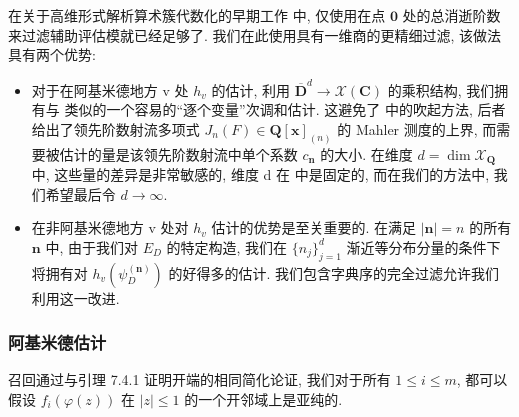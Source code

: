 \begin{remark}\label{rem:8.2.10}
在关于高维形式解析算术簇代数化的早期工作 \cite{Bos01}\cite{Bos04} 中, 
仅使用在点 \(\mathbf{0}\) 处的总消逝阶数来过滤辅助评估模就已经足够了. 
我们在此使用具有一维商的更精细过滤, 该做法具有两个优势:
\begin{itemize}
  \item[(1)] 对于在阿基米德地方 v 处 \(h_v\) 的估计, 
  利用 \(\overline{\mathbf{D}}^d \to \mathcal{X}(\mathbf{C})\) 的乘积结构, 
  我们拥有与 \cite[引理 2.4.1]{CDT21} 类似的一个容易的“逐个变量”次调和估计. 
  这避免了 \cite[第 4.3.2 节]{Bos01} 中的吹起方法, 
  后者给出了领先阶数射流多项式 \(J_n(F) \in \mathbf{Q}[\mathbf{x}]_{(n)}\) 的 Mahler 测度的上界, 
  而需要被估计的量是该领先阶数射流中单个系数 \(c_{\mathbf{n}}\) 的大小. 
  在维度 \(d = \dim \mathcal{X}_{\mathbf{Q}}\) 中, 这些量的差异是非常敏感的, 
  维度 d 在 \cite{Bos01} 中是固定的, 
  而在我们的方法中, 我们希望最后令 \(d \to \infty\).
  \item[(2)] 在非阿基米德地方 v 处对 \(h_v\) 估计的优势是至关重要的. 
  在满足 \(|\mathbf{n}| = n\) 的所有 \(\mathbf{n}\) 中, 
  由于我们对 \(E_D\) 的特定构造, 我们在 \(\{n_j\}_{j=1}^d\) 渐近等分布分量的条件下将拥有对 \(h_v\left(\psi_D^{(\mathbf{n})}\right)\) 的好得多的估计. 
  我们包含字典序的完全过滤允许我们利用这一改进. \end{itemize}
\end{remark}

\subsubsection{阿基米德估计}\label{sec:8.2.11}

召回通过与引理 7.4.1 证明开端的相同简化论证, 
我们对于所有 \(1 \le i \le m\), 都可以假设 \(f_i(\varphi(z))\) 
在 \(|z| \le 1\) 的一个开邻域上是亚纯的.

